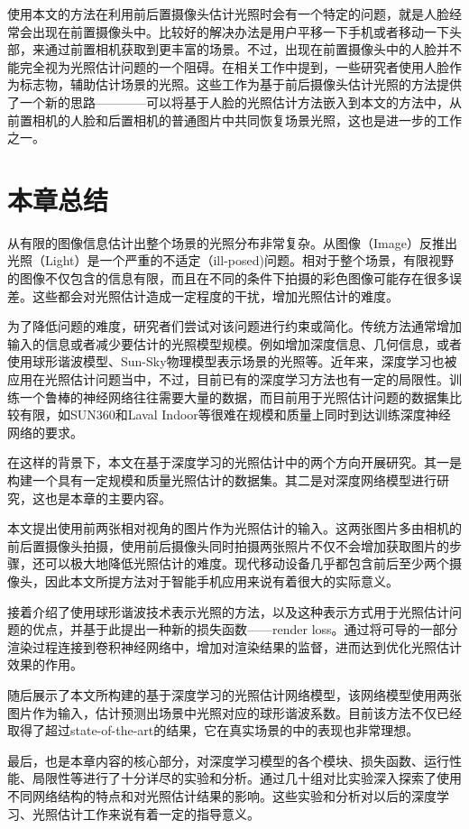 使用本文的方法在利用前后置摄像头估计光照时会有一个特定的问题，就是人脸经常会出现在前置摄像头中。比较好的解决办法是用户平移一下手机或者移动一下头部，来通过前置相机获取到更丰富的场景。不过，出现在前置摄像头中的人脸并不能完全视为光照估计问题的一个阻碍。在相关工作中提到，一些研究者使用人脸作为标志物，辅助估计场景的光照。这些工作为基于前后摄像头估计光照的方法提供了一个新的思路————可以将基于人脸的光照估计方法嵌入到本文的方法中，从前置相机的人脸和后置相机的普通图片中共同恢复场景光照，这也是进一步的工作之一。
\section{本章总结}
从有限的图像信息估计出整个场景的光照分布非常复杂。从图像（Image）反推出光照（Light）是一个严重的不适定（ill-posed)问题。相对于整个场景，有限视野的图像不仅包含的信息有限，而且在不同的条件下拍摄的彩色图像可能存在很多误差。这些都会对光照估计造成一定程度的干扰，增加光照估计的难度。

为了降低问题的难度，研究者们尝试对该问题进行约束或简化。传统方法通常增加输入的信息或者减少要估计的光照模型规模。例如增加深度信息、几何信息，或者使用球形谐波模型、Sun-Sky物理模型表示场景的光照等。近年来，深度学习也被应用在光照估计问题当中，不过，目前已有的深度学习方法也有一定的局限性。训练一个鲁棒的神经网络往往需要大量的数据，而目前用于光照估计问题的数据集比较有限，如SUN360\cite{xiao2012recognizing}和Laval Indoor\cite{gardner2017learning}等很难在规模和质量上同时到达训练深度神经网络的要求。

在这样的背景下，本文在基于深度学习的光照估计中的两个方向开展研究。其一是构建一个具有一定规模和质量光照估计的数据集。其二是对深度网络模型进行研究，这也是本章的主要内容。

本文提出使用前两张相对视角的图片作为光照估计的输入。这两张图片多由相机的前后置摄像头拍摄，使用前后摄像头同时拍摄两张照片不仅不会增加获取图片的步骤，还可以极大地降低光照估计的难度。现代移动设备几乎都包含前后至少两个摄像头，因此本文所提方法对于智能手机应用来说有着很大的实际意义。

接着介绍了使用球形谐波技术表示光照的方法，以及这种表示方式用于光照估计问题的优点，并基于此提出一种新的损失函数——render loss。通过将可导的一部分渲染过程连接到卷积神经网络中，增加对渲染结果的监督，进而达到优化光照估计效果的作用。

随后展示了本文所构建的基于深度学习的光照估计网络模型，该网络模型使用两张图片作为输入，估计预测出场景中光照对应的球形谐波系数。目前该方法不仅已经取得了超过state-of-the-art的结果，它在真实场景的中的表现也非常理想。

最后，也是本章内容的核心部分，对深度学习模型的各个模块、损失函数、运行性能、局限性等进行了十分详尽的实验和分析。通过几十组对比实验深入探索了使用不同网络结构的特点和对光照估计结果的影响。这些实验和分析对以后的深度学习、光照估计工作来说有着一定的指导意义。